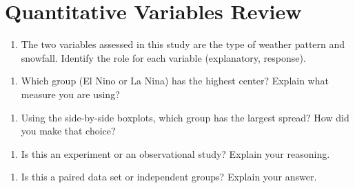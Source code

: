 \documentclass[
]{report}
\providecommand{\tightlist}{%
  \setlength{\itemsep}{0pt}\setlength{\parskip}{0pt}}
\begin{document}
\hypertarget{quantitative-variables-review}{%
\section{Quantitative Variables Review}\label{quantitative-variables-review}}

\begin{enumerate}
\def\labelenumi{\arabic{enumi}.}
\tightlist
\item
  The two variables assessed in this study are the type of weather pattern and snowfall. Identify the role for each variable (explanatory, response).
\end{enumerate}

\vspace{1in}

\begin{enumerate}
\def\labelenumi{\arabic{enumi}.}
\setcounter{enumi}{1}
\tightlist
\item
  Which group (El Nino or La Nina) has the highest center? Explain what measure you are using?
\end{enumerate}

\vspace{1in}

\begin{enumerate}
\def\labelenumi{\arabic{enumi}.}
\setcounter{enumi}{2}
\tightlist
\item
  Using the side-by-side boxplots, which group has the largest spread? How did you make that choice?
\end{enumerate}

\vspace{1in}

\begin{enumerate}
\def\labelenumi{\arabic{enumi}.}
\setcounter{enumi}{3}
\tightlist
\item
  Is this an experiment or an observational study? Explain your reasoning.
\end{enumerate}

\vspace{1in}

\begin{enumerate}
\def\labelenumi{\arabic{enumi}.}
\setcounter{enumi}{4}
\tightlist
\item
  Is this a paired data set or independent groups? Explain your answer.
\end{enumerate}

\vspace{1in}
\end{document}
